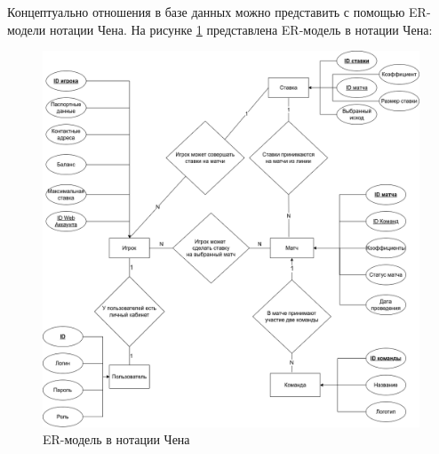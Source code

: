Концептуально отношения в базе данных можно представить с помощью ER-модели нотации Чена.
На рисунке \ref{fig::chen} представлена ER-модель в нотации Чена:
\FloatBarrier
\begin{figure}[hp]	
	\begin{center}
		\includegraphics[width=\linewidth]{inc/chen.png}
	\end{center}
	\caption{ER-модель в нотации Чена}
	\label{fig::chen}
\end{figure}
\FloatBarrier
